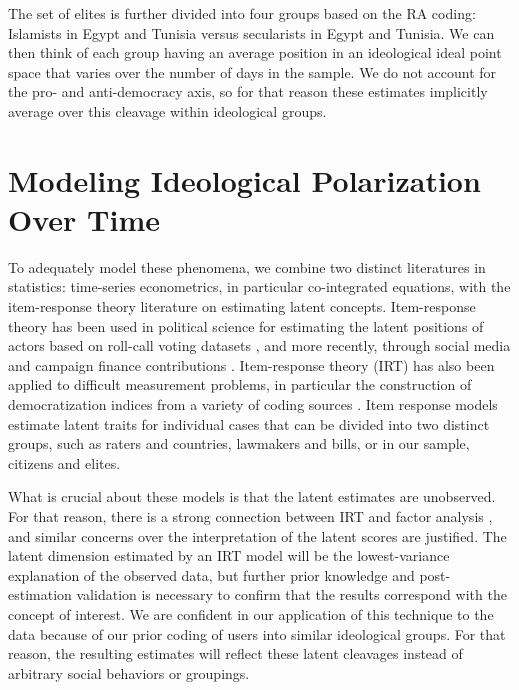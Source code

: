 \documentclass[12pt]{article}
\begin{document}
The set of elites is further divided into four groups based on the RA coding: Islamists in Egypt and Tunisia versus secularists in Egypt and Tunisia. We can then think of each group having an average position in an ideological ideal point space that varies over the number of days in the sample. We do not account for the pro- and anti-democracy axis, so for that reason these estimates implicitly average over this cleavage within ideological groups.

\section*{Modeling Ideological Polarization Over Time}
To adequately model these phenomena, we combine two distinct literatures in statistics: time-series econometrics, in particular co-integrated equations, with the item-response theory literature on estimating latent concepts. Item-response theory has been used in political science for estimating the latent positions of actors based on roll-call voting datasets \parencite{jackman2004}, and more recently, through social media and campaign finance contributions \parencite{bonica2014,barbera2015}. Item-response theory (IRT) has also been applied to difficult measurement problems, in particular the construction of democratization indices from a variety of coding sources \parencite{vdem2017,treier2008}. Item response models estimate latent traits for individual cases that can be divided into two distinct groups, such as raters and countries, lawmakers and bills, or in our sample, citizens and elites. 

What is crucial about these models is that the latent estimates are unobserved. For that reason, there is a strong connection between IRT and factor analysis \parencite{takane1986}, and similar concerns over the interpretation of the latent scores are justified. The latent dimension estimated by an IRT model will be the lowest-variance explanation of the observed data, but further prior knowledge and post-estimation validation is necessary to confirm that the results correspond with the concept of interest. We are confident in our application of this technique to the data because of our prior coding of users into similar ideological groups. For that reason, the resulting estimates will reflect these latent cleavages instead of arbitrary social behaviors or groupings.
\end{document}
